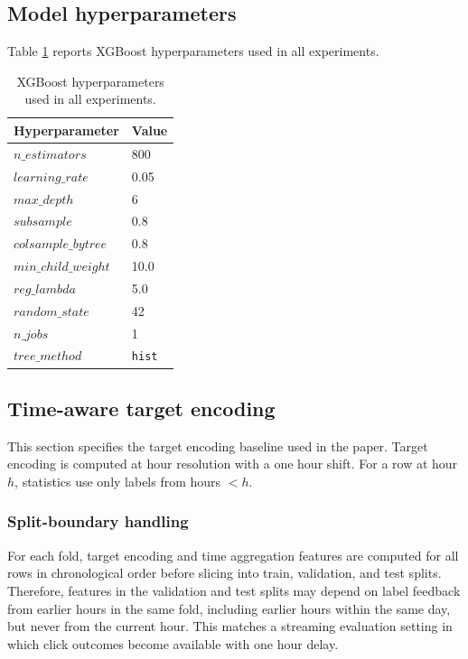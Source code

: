 \subsection*{Model hyperparameters}
Table \ref{tab:xgb_params} reports XGBoost hyperparameters used in all experiments.

\begin{table}[t]
  \centering
  \begin{tabular}{ll}
    \toprule
    Hyperparameter & Value \\
    \midrule
    $n\_estimators$ & 800 \\
    $learning\_rate$ & 0.05 \\
    $max\_depth$ & 6 \\
    $subsample$ & 0.8 \\
    $colsample\_bytree$ & 0.8 \\
    $min\_child\_weight$ & 10.0 \\
    $reg\_lambda$ & 5.0 \\
    $random\_state$ & 42 \\
    $n\_jobs$ & 1 \\
    $tree\_method$ & \texttt{hist} \\
    \bottomrule
  \end{tabular}
  \caption{XGBoost hyperparameters used in all experiments.}
  \label{tab:xgb_params}
\end{table}

\subsection{Time-aware target encoding}
\label{sec:appendix_te_details}
This section specifies the target encoding baseline used in the paper.
Target encoding is computed at hour resolution with a one hour shift.
For a row at hour $h$, statistics use only labels from hours $< h$.

\subsubsection*{Split-boundary handling}
For each fold, target encoding and time aggregation features are computed for all rows in chronological order before slicing into train, validation, and test splits.
Therefore, features in the validation and test splits may depend on label feedback from earlier hours in the same fold, including earlier hours within the same day, but never from the current hour.
This matches a streaming evaluation setting in which click outcomes become available with one hour delay.

